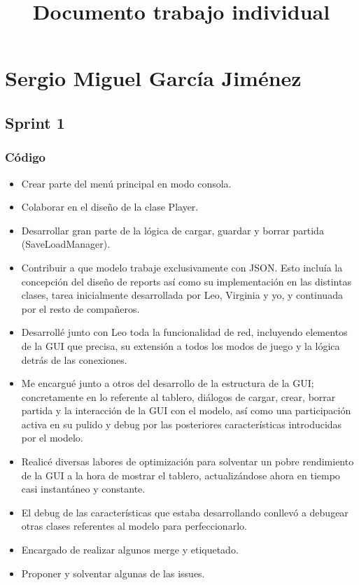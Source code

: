 \documentclass{article}
\begin{document}
\title{Documento trabajo individual}
\maketitle
\section*{Sergio Miguel García Jiménez}
\subsection*{Sprint 1}
\subsubsection*{Código}

\begin{itemize}
\item Crear parte del menú principal en modo consola.
\item Colaborar en el diseño de la clase Player.
\item Desarrollar gran parte de la lógica de cargar, guardar y borrar partida (SaveLoadManager).
\item Contribuir a que modelo trabaje exclusivamente con JSON. Esto incluía la concepción del diseño de reports así como su implementación en las distintas clases, tarea inicialmente desarrollada por Leo, Virginia y yo, y continuada por el resto de compañeros.
\item Desarrollé junto con Leo toda la funcionalidad de red, incluyendo elementos de la GUI que precisa, su extensión a todos los modos de juego y la lógica detrás de las conexiones.
\item Me encargué junto a otros del desarrollo de la estructura de la GUI; concretamente en lo referente al tablero, diálogos de cargar, crear, borrar partida y la interacción de la GUI con el modelo, así como una participación activa en su pulido y debug por las posteriores características introducidas por el modelo.
\item Realicé diversas labores de optimización para solventar un pobre rendimiento de la GUI a la hora de mostrar el tablero, actualizándose ahora en tiempo casi instantáneo y constante.
\item El debug de las características que estaba desarrollando conllevó a debugear otras clases referentes al modelo para perfeccionarlo.
\item Encargado de realizar algunos merge y etiquetado.
\item Proponer y solventar algunas de las issues.
\end{itemize}
\end{document}
